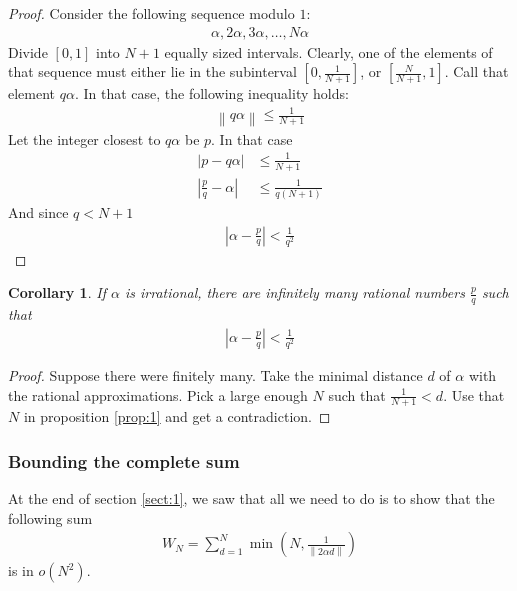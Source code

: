 \documentclass[12pt, titlepage]{article}
\newtheorem{cor}[thm]{Corollary}
\theoremstyle{definition}
\newcommand{\norm}[1]{\left\lVert#1\right\rVert}
\begin{document}
\begin{proof}
    Consider the following sequence modulo $1$:
    \begin{align*}
        \alpha, 2\alpha, 3\alpha, \ldots, N\alpha
    \end{align*}
    Divide $[0,1]$ into $N+1$ equally sized intervals. Clearly, one of the elements of that sequence must either lie in the subinterval $\left[ 0, \frac{1}{N+1} \right]$, or $\left[ \frac{N}{N+1}, 1 \right]$. Call that element $q\alpha$. In that case, the following inequality holds:
    \begin{align*}
        \norm{q\alpha} \leq \frac{1}{N+1}
    \end{align*}
    Let the integer closest to $q\alpha$ be $p$. In that case
    \begin{align*}
        \left| p - q\alpha \right| &\leq \frac{1}{N+1} \\
        \left| \frac{p}{q} - \alpha \right| &\leq \frac{1}{q(N+1)}
    \end{align*}
    And since $q < N+1$
    \begin{align*}
        \left| \alpha - \frac{p}{q} \right| < \frac{1}{q^2}
    \end{align*}
\end{proof}

\begin{cor}
    If $\alpha$ is irrational, there are infinitely many rational numbers $\frac{p}{q}$ such that
    \begin{align*}
        \left| \alpha - \frac{p}{q} \right| < \frac{1}{q^2}
    \end{align*}
\end{cor}

\begin{proof}
    Suppose there were finitely many. Take the minimal distance $d$ of $\alpha$ with the rational approximations. Pick a large enough $N$ such that $\frac{1}{N+1} < d$. Use that $N$ in proposition \ref{prop:1} and get a contradiction.
\end{proof}

\subsubsection{Bounding the complete sum\cite{weyl}}
At the end of section \ref{sect:1}, we saw that all we need to do is to show that the following sum
\begin{align*}
    W_N = \sum_{d=1}^{N} \min\left( N, \frac{1}{\norm{2\alpha d}} \right)
\end{align*}
is in $o(N^2)$.
\end{document}

